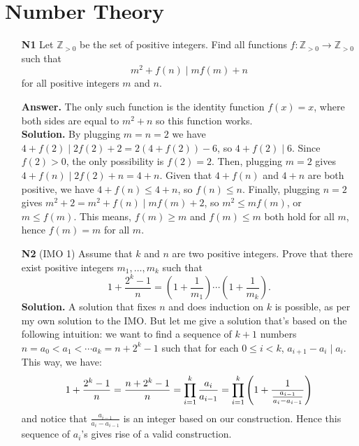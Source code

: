 \documentclass[11pt,a4paper]{article}
\begin{document}
\section*{Number Theory}
\begin{enumerate}
	\item [\textbf{N1}] Let $\mathbb{Z} _{>0}$ be the set of positive integers. Find all functions  $f: \mathbb{Z} _{>0}\rightarrow \mathbb{Z} _{>0}$ such that
	\[ m^2 + f(n) \mid mf(m) +n \]
	for all positive integers $m$ and $n$.
	
	\textbf{Answer.} The only such function is the identity function $f(x)=x$, where both sides are equal to $m^2+n$ so this function works. \\
	\textbf{Solution.} By plugging $m=n=2$ we have $4+f(2)\mid 2f(2)+2=2(4+f(2))-6$, so $4+f(2)\mid 6$. Since $f(2)>0$, the only possibility is $f(2)=2$. 
	Then, plugging $m=2$ gives $4+f(n)\mid 2f(2)+n=4+n$. Given that $4+f(n)$ and $4+n$ are both positive, we have $4+f(n)\le 4+n$, so $f(n)\le n$. 
	Finally, plugging $n=2$ gives $m^2+2=m^2+f(n)\mid mf(m)+2$, so $m^2\le mf(m)$, or $m\le f(m)$. 
	This means, $f(m)\ge m$ and $f(m)\le m$ both hold for all $m$, hence $f(m)=m$ for all $m$. 
	
	\item[\textbf{N2}] (IMO 1) Assume that $k$ and $n$ are two positive integers. Prove that there exist positive integers $m_1 , \dots , m_k$ such that \[1+\frac{2^k-1}{n}=\left(1+\frac1{m_1}\right)\cdots \left(1+\frac1{m_k}\right).\]
	\textbf{Solution.} A solution that fixes $n$ and does induction on $k$ is possible, as per my own solution to the IMO. But let me give a solution that's based on the following intuition: we want to find a sequence of $k+1$ numbers $n=a_0<a_1<\cdots a_k=n+2^k-1$ such that for each $0\le i<k$, $a_{i+1}-a_i\mid a_i$. This way, we have:
	\[
	1+\frac{2^k-1}{n}
	=\frac{n+2^k-1}{n}
	=\displaystyle\prod_{i=1}^k \frac{a_i}{a_{i-1}}
	=\displaystyle\prod_{i=1}^k\left(1 + \frac{1}{\frac{a_{i-1}}{a_i-a_{i-1}}}\right)
	\]
	and notice that $\frac{a_{i-1}}{a_i-a_{i-1}}$ is an integer based on our construction. Hence this sequence of $a_i$'s gives rise of a valid construction.
	

\end{enumerate}
\end{document}
